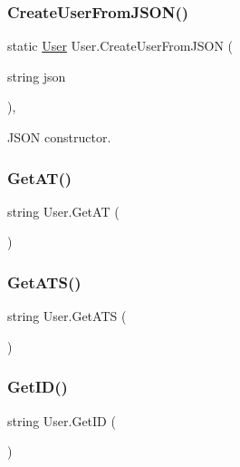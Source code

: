 \subsubsection{\texorpdfstring{CreateUserFromJSON()}{CreateUserFromJSON()}}
{\footnotesize\ttfamily static \mbox{\hyperlink{class_user}{User}} User.\+Create\+User\+From\+J\+S\+ON (\begin{DoxyParamCaption}\item[{string}]{json }\end{DoxyParamCaption})\hspace{0.3cm}{\ttfamily [inline]}, {\ttfamily [static]}}



J\+S\+ON constructor. 

\mbox{\label{class_user_a208b67765760712a54a3c354f351ab34}} 
\subsubsection{\texorpdfstring{GetAT()}{GetAT()}}
{\footnotesize\ttfamily string User.\+Get\+AT (\begin{DoxyParamCaption}{ }\end{DoxyParamCaption})\hspace{0.3cm}{\ttfamily [inline]}}

\mbox{\label{class_user_ab1bd8f0f2b784942840ab712e61a3979}} 
\subsubsection{\texorpdfstring{GetATS()}{GetATS()}}
{\footnotesize\ttfamily string User.\+Get\+A\+TS (\begin{DoxyParamCaption}{ }\end{DoxyParamCaption})\hspace{0.3cm}{\ttfamily [inline]}}

\mbox{\label{class_user_a91e7a9a20ab853c8291c19e3b607ddeb}} 
\subsubsection{\texorpdfstring{GetID()}{GetID()}}
{\footnotesize\ttfamily string User.\+Get\+ID (\begin{DoxyParamCaption}{ }\end{DoxyParamCaption})\hspace{0.3cm}{\ttfamily [inline]}}

